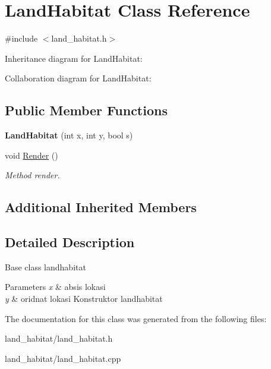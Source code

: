 \hypertarget{classLandHabitat}{}\section{Land\+Habitat Class Reference}
\label{classLandHabitat}


{\ttfamily \#include $<$land\+\_\+habitat.\+h$>$}



Inheritance diagram for Land\+Habitat\+:


Collaboration diagram for Land\+Habitat\+:
\subsection*{Public Member Functions}
\begin{DoxyCompactItemize}
\item 
{\bfseries Land\+Habitat} (int x, int y, bool s)\hypertarget{classLandHabitat_ad4f49b95b718f22d7123bf1a9205584d}{}\label{classLandHabitat_ad4f49b95b718f22d7123bf1a9205584d}

\item 
void \hyperlink{classLandHabitat_a968a2e06226bd33f6fcc7c95e2ce9009}{Render} ()\hypertarget{classLandHabitat_a968a2e06226bd33f6fcc7c95e2ce9009}{}\label{classLandHabitat_a968a2e06226bd33f6fcc7c95e2ce9009}

\begin{DoxyCompactList}\small\item\em Method render. \end{DoxyCompactList}\end{DoxyCompactItemize}
\subsection*{Additional Inherited Members}


\subsection{Detailed Description}
Base class landhabitat


\begin{DoxyParams}{Parameters}
{\em x} & absis lokasi \\
\hline
{\em y} & oridnat lokasi Konstruktor landhabitat \\
\hline
\end{DoxyParams}


The documentation for this class was generated from the following files\+:\begin{DoxyCompactItemize}
\item 
land\+\_\+habitat/land\+\_\+habitat.\+h\item 
land\+\_\+habitat/land\+\_\+habitat.\+cpp\end{DoxyCompactItemize}
